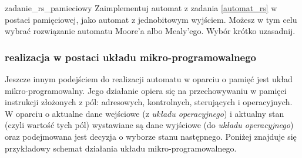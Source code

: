 \documentclass{pdfBooklets}
\begin{document}
\begin{Zadanie}[breakable]{}{zadanie_rs_pamieciowy}
Zaimplementuj automat z zadania \ref{automat_rs} w postaci pamięciowej, jako automat z jednobitowym wyjściem. Możesz w tym celu wybrać rozwiązanie automatu Moore'a albo Mealy'ego. Wybór krótko uzasadnij.
\end{Zadanie}


\subsubsection{realizacja w postaci układu mikro-programowalnego {\Symbola 🤔}}

Jeszcze innym podejściem do realizacji automatu w oparciu o pamięć jest układ mikro-programowalny. Jego działanie opiera się na przechowywaniu w pamięci instrukcji złożonych z pól: adresowych, kontrolnych, sterujących i operacyjnych.
W oparciu o aktualne dane wejściowe (z \emph{układu operacyjnego}) i aktualny stan (czyli wartość tych pól) wystawiane są dane wyjściowe (do \emph{układu operacyjnego}) oraz podejmowana jest decyzja o wyborze stanu następnego.
Poniżej znajduje się przykładowy schemat działania układu mikro-programowalnego.
\end{document}
